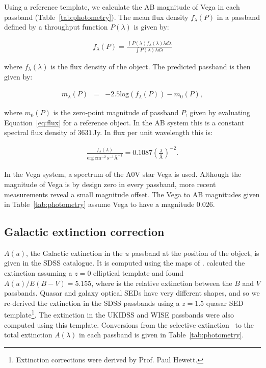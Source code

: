 Using a reference template, we calculate the AB magnitude of Vega in each passband (Table~\ref{tab:photometry}). 
The mean flux density $f_\lambda(P)$ in a passband defined by a throughput function $P(\lambda)$ is given by: 

\begingroup\makeatletter{}\check@mathfonts
\begin{eqnarray}
\label{eq:flux}
  f_\lambda(P) = \frac {\int P(\lambda)f_\lambda(\lambda)\lambda d\lambda} {\int P(\lambda)\lambda d\lambda} 
\end{eqnarray}
\endgroup

\noindent where $f_\lambda(\lambda)$ is the flux density of the object. 
The predicted passband is then given by:   

\begingroup\makeatletter{}\check@mathfonts
\begin{eqnarray}
\label{eq:mag}
  m_\lambda(P) & = & -2.5\text{log}(f_\lambda(P)) - m_0(P), 
\end{eqnarray}
\endgroup

\noindent where $m_0(P)$ is the zero-point magnitude of passband $P$, given by evaluating Equation~\ref{eq:flux} for a reference object. 
In the AB system this is a constant spectral flux density of $3631$\,Jy. 
In flux per unit wavelength this is:  

\begingroup\makeatletter{}\check@mathfonts
\begin{eqnarray}
  \frac{f_\lambda(\lambda)}{\text{erg}~\text{cm}^{-2}~\text{s}^{-1} \text{\AA}^{-1}} = 0.1087 \left(\frac{\lambda}{\text{\AA}}\right)^{-2}.
\end{eqnarray}
\endgroup

\noindent In the Vega system, a spectrum of the A$0$V star Vega is used. 
Although the magnitude of Vega is by design zero in every passband, more recent measurements reveal a small magnitude offset.
The Vega to AB magnitudes given in Table~\ref{tab:photometry} assume Vega to have a magnitude $0.026$. 

\subsection{Galactic extinction correction}

$A(u)$, the Galactic extinction in the $u$ passband at the position of the object, is given in the SDSS catalogue. 
It is computed using the maps of \citet{schlegel98}.
\citet{schlegel98} calcuted the extinction assuming a $z=0$ elliptical template and found $A(u)/E(B-V)=5.155$, where \ebv is the relative extinction between the $B$ and $V$ passbands. 
Quasar and galaxy optical SEDs have very different shapes, and so we re-derived the extinction in the SDSS passbands using a $z=1.5$ quasar SED template\footnote{Extinction corrections were derived by Prof. Paul Hewett.}.
The extinction in the UKIDSS and WISE passbands were also computed using this template. 
Conversions from the selective extinction \ebv\, to the total extinction $A(\lambda)$ in each passband is given in Table~\ref{tab:photometry}.  
 
